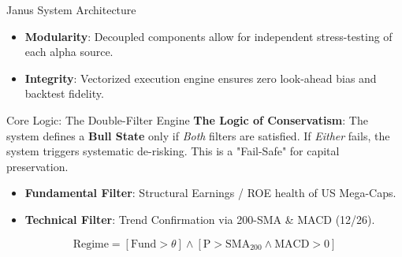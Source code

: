 \documentclass[10pt]{beamer}
\begin{document}
\begin{frame}{Janus System Architecture}
    \begin{center}
    \end{center}
    \begin{itemize}
        \item \textbf{Modularity}: Decoupled components allow for independent stress-testing of each alpha source.
        \item \textbf{Integrity}: Vectorized execution engine ensures zero look-ahead bias and backtest fidelity.
    \end{itemize}
\end{frame}

\begin{frame}{Core Logic: The Double-Filter Engine}
    \textbf{The Logic of Conservatism}:
    The system defines a \textbf{Bull State} only if \textit{Both} filters are satisfied. If \textit{Either} fails, the system triggers systematic de-risking. This is a "Fail-Safe" for capital preservation.
    \vspace{0.4cm}
    \begin{itemize}
        \item \textbf{Fundamental Filter}: Structural Earnings / ROE health of US Mega-Caps.
        \item \textbf{Technical Filter}: Trend Confirmation via 200-SMA \& MACD (12/26).
    \end{itemize}
    \vspace{0.3cm}
    \[ \text{Regime} = [\text{Fund} > \theta] \wedge [\text{P} > \text{SMA}_{200} \wedge \text{MACD} > 0] \]
\end{frame}
\end{document}
